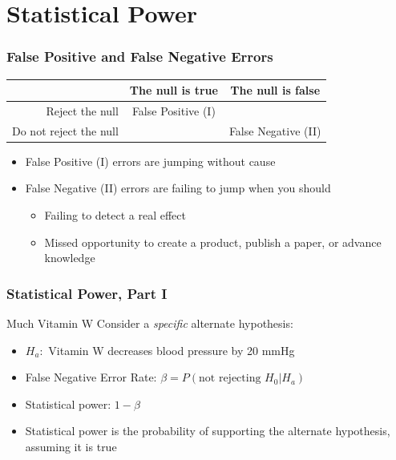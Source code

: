 \documentclass[12pt, block=fill]{beamer}
\begin{document}
\section{Statistical Power}

\begin{frame}
  \frametitle{False Positive and False Negative Errors}
  \begin{tabular}{ r | c | c  }
    & The null is true & The null is false \\
    \hline
    Reject the null & False Positive (I) & \\
    Do not reject the null & & False Negative (II) \\
  \end{tabular}
  \vskip 1cm
  
  \begin{itemize}
  \item False Positive (I) errors are jumping without cause
  \item False Negative (II) errors are failing to jump when you
    should
    
    \begin{itemize}
    \item Failing to detect a real effect
    \item Missed opportunity to create a product, publish a paper, or advance knowledge
    \end{itemize}
  \end{itemize} 
\end{frame}


\begin{frame}
  \frametitle{Statistical Power, Part I}

  \begin{exampleblock}{Much Vitamin W}
    Consider a \textit{specific} alternate hypothesis: 
    
    \begin{itemize}
    \item $H_a: $ Vitamin W decreases blood pressure by 20 mmHg
    \end{itemize}
  \end{exampleblock} 

  \begin{itemize} 
  \item False Negative Error Rate: $\beta = P(\text{not rejecting }H_0 | H_a)$
  \item Statistical power: $1-\beta$
  \item Statistical power is the probability of supporting the
    alternate hypothesis, assuming it is true
  \end{itemize} 
\end{frame}
  
\end{document}
